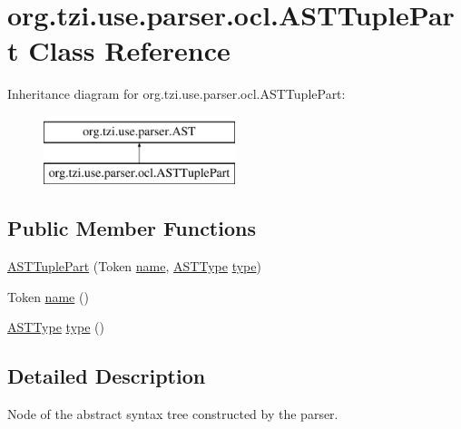 \hypertarget{classorg_1_1tzi_1_1use_1_1parser_1_1ocl_1_1_a_s_t_tuple_part}{\section{org.\-tzi.\-use.\-parser.\-ocl.\-A\-S\-T\-Tuple\-Part Class Reference}
\label{classorg_1_1tzi_1_1use_1_1parser_1_1ocl_1_1_a_s_t_tuple_part}
}
Inheritance diagram for org.\-tzi.\-use.\-parser.\-ocl.\-A\-S\-T\-Tuple\-Part\-:\begin{figure}[H]
\begin{center}
\leavevmode
\includegraphics[height=2.000000cm]{classorg_1_1tzi_1_1use_1_1parser_1_1ocl_1_1_a_s_t_tuple_part}
\end{center}
\end{figure}
\subsection*{Public Member Functions}
\begin{DoxyCompactItemize}
\item 
\hyperlink{classorg_1_1tzi_1_1use_1_1parser_1_1ocl_1_1_a_s_t_tuple_part_a9102bc37cef7b4c02959b74801414e68}{A\-S\-T\-Tuple\-Part} (Token \hyperlink{classorg_1_1tzi_1_1use_1_1parser_1_1ocl_1_1_a_s_t_tuple_part_a7a5de13a04eafb986b693f32e0a74527}{name}, \hyperlink{classorg_1_1tzi_1_1use_1_1parser_1_1ocl_1_1_a_s_t_type}{A\-S\-T\-Type} \hyperlink{classorg_1_1tzi_1_1use_1_1parser_1_1ocl_1_1_a_s_t_tuple_part_a5d5f9de2e25a61da6f4f522409ecb4cb}{type})
\item 
Token \hyperlink{classorg_1_1tzi_1_1use_1_1parser_1_1ocl_1_1_a_s_t_tuple_part_a7a5de13a04eafb986b693f32e0a74527}{name} ()
\item 
\hyperlink{classorg_1_1tzi_1_1use_1_1parser_1_1ocl_1_1_a_s_t_type}{A\-S\-T\-Type} \hyperlink{classorg_1_1tzi_1_1use_1_1parser_1_1ocl_1_1_a_s_t_tuple_part_a5d5f9de2e25a61da6f4f522409ecb4cb}{type} ()
\end{DoxyCompactItemize}


\subsection{Detailed Description}
Node of the abstract syntax tree constructed by the parser.

